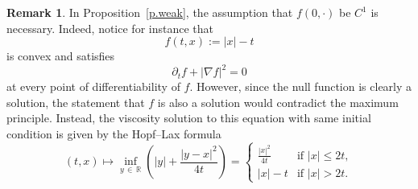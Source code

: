 \documentclass[10pt]{amsart}
\theoremstyle{definition}\newtheorem{defi}[theo]{Definition}\newtheorem{rema}[theo]{Remark}\newtheorem{exam}[theo]{Example}\newtheorem{exem}[theo]{Example}\newtheorem{nota}[theo]{Notation}
\newcommand{\R}{\mathbb{R}}
\renewcommand{\le}{\leqslant}
\newcommand{\Ll}{\left}
\newcommand{\Rr}{\right}
\newcommand{\dr}{\partial}
\begin{document}
\begin{rema}\label{r.diff.assumption}
In Proposition~\ref{p.weak}, the assumption that $f(0,\cdot)$ be $C^1$ is necessary. Indeed, notice for instance that
\begin{equation*}
f(t,x) := |x| - t
\end{equation*}
is convex and satisfies
\begin{equation*}
\dr_t f + \Ll|\nabla f\Rr|^2 = 0
\end{equation*}
at every point of differentiability of $f$. However, since the null function is clearly a solution, the statement that $f$ is also a solution would contradict the maximum principle. Instead, the viscosity solution to this equation with same initial condition is given by the Hopf--Lax formula
\begin{equation*}
(t,x) \mapsto \inf_{y\,\in\,\R} \Ll(|y| + \frac{|y-x|^2}{4t} \Rr) =
\begin{cases}
\frac{|x|^2}{4t} & \text{if } |x| \le 2t, \\
|x| - t & \text{if } |x| > 2t.
\end{cases}
\end{equation*}
\end{rema}
\end{document}
